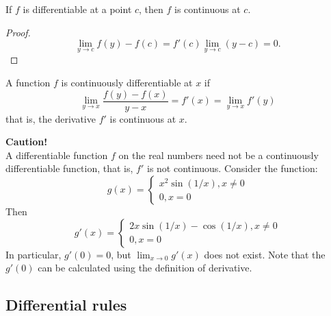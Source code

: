 \begin{refsection}
\begin{definition}
\end{definition}

\begin{lemma}\cite[91]{fitzpatrick2006advanced} If $f$ is differentiable at a point $c$, then $f$ is continuous at $c$.
\end{lemma}
\begin{proof}
$$\lim_{y\rightarrow c} f(y)-f(c) = f'(c)\lim_{y\rightarrow c}(y-c) = 0.$$	
\end{proof}
 

\begin{definition}
A function $f$ is continuously differentiable at $x$ if
$$\lim_{y\to x}\frac{f(y)-f(x)}{y-x} = f'(x) = \lim_{y\to x} f'(y)$$
that is, the derivative $f'$ is continuous at $x$.
\end{definition}


\begin{mdframed}
\textbf{Caution!}\\
A differentiable function $f$ on the real numbers need not be a continuously differentiable function, that is, $f'$ is not continuous.
Consider the function:
$$g(x) = 
\begin{cases}
x^2\sin(1/x),x\neq 0\\
0,x=0
\end{cases}$$
Then
$$g'(x) = 
\begin{cases}
2x\sin(1/x)-\cos(1/x),x\neq 0\\
0,x=0
\end{cases}$$
In particular, $g'(0) = 0$, but $\lim_{x\to 0}g'(x)$ does not exist. Note that the $g'(0)$ can be calculated using the definition of derivative.
\end{mdframed}




\subsection{Differential rules}


\end{refsection}
